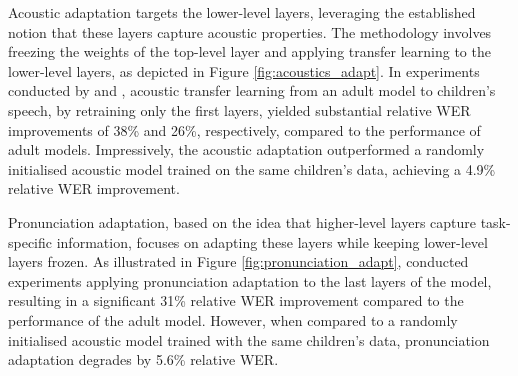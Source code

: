 Acoustic adaptation targets the lower-level layers, leveraging the established notion that these layers capture acoustic properties. The methodology involves freezing the weights of the top-level layer and applying transfer learning to the lower-level layers, as depicted in Figure \ref{fig:acoustics_adapt}. In experiments conducted by \cite{TFchildren} and \cite{TransferLF}, acoustic transfer learning from an adult model to children's speech, by retraining only the first layers, yielded substantial relative WER improvements of 38\% and 26\%, respectively, compared to the performance of adult models. Impressively, the acoustic adaptation outperformed a randomly initialised acoustic model trained on the same children's data, achieving a 4.9\% relative WER improvement.

Pronunciation adaptation, based on the idea that higher-level layers capture task-specific information, focuses on adapting these layers while keeping lower-level layers frozen. As illustrated in Figure \ref{fig:pronunciation_adapt}, \cite{TFchildren} conducted experiments applying pronunciation adaptation to the last layers of the model, resulting in a significant 31\% relative WER improvement compared to the performance of the adult model. However, when compared to a randomly initialised acoustic model trained with the same children's data, pronunciation adaptation degrades by 5.6\% relative WER.

